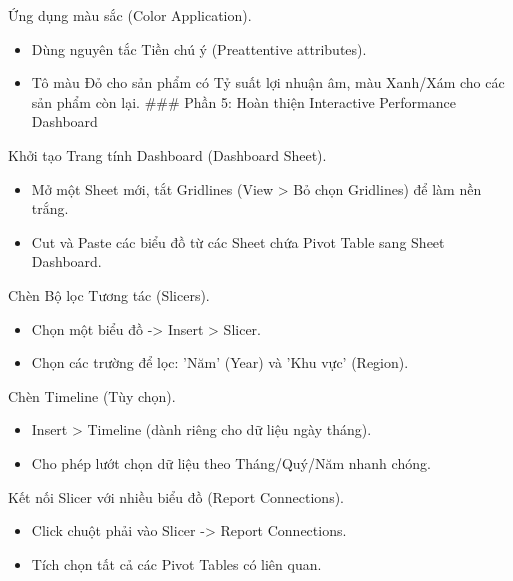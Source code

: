 \documentclass[aspectratio=169]{beamer}
\begin{document}
\begin{frame}{Ứng dụng màu sắc (Color Application).}
    \begin{itemize}
        \item Dùng nguyên tắc Tiền chú ý (Preattentive attributes).
        \item Tô màu Đỏ cho sản phẩm có Tỷ suất lợi nhuận âm, màu Xanh/Xám cho các sản phẩm còn lại.
        ### Phần 5: Hoàn thiện Interactive Performance Dashboard
    \end{itemize}
\end{frame}


\begin{frame}{Khởi tạo Trang tính Dashboard (Dashboard Sheet).}
    \begin{itemize}
        \item Mở một Sheet mới, tắt Gridlines (View > Bỏ chọn Gridlines) để làm nền trắng.
        \item Cut và Paste các biểu đồ từ các Sheet chứa Pivot Table sang Sheet Dashboard.
    \end{itemize}
\end{frame}


\begin{frame}{Chèn Bộ lọc Tương tác (Slicers).}
    \begin{itemize}
        \item Chọn một biểu đồ -> Insert > Slicer.
        \item Chọn các trường để lọc: 'Năm' (Year) và 'Khu vực' (Region).
    \end{itemize}
\end{frame}


\begin{frame}{Chèn Timeline (Tùy chọn).}
    \begin{itemize}
        \item Insert > Timeline (dành riêng cho dữ liệu ngày tháng).
        \item Cho phép lướt chọn dữ liệu theo Tháng/Quý/Năm nhanh chóng.
    \end{itemize}
\end{frame}


\begin{frame}{Kết nối Slicer với nhiều biểu đồ (Report Connections).}
    \begin{itemize}
        \item Click chuột phải vào Slicer -> Report Connections.
        \item Tích chọn tất cả các Pivot Tables có liên quan.
    \end{itemize}
\end{frame}
\end{document}
